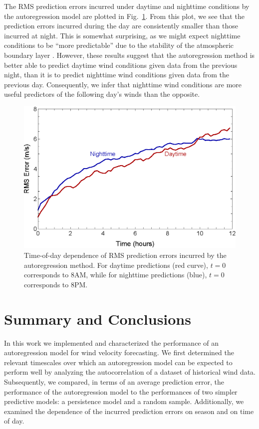 \documentclass[11pt, oneside]{article}
\newcommand{\figref}[1]{Fig.~\ref{#1}}
\begin{document}
The RMS prediction errors incurred under daytime and nighttime conditions by the autoregression model are plotted in \figref{fig:DiurnalRMS}.
From this plot, we see that the prediction errors incurred during the day are consistently smaller than those incurred at night.
This is somewhat surprising, as we might expect nighttime conditions to be ``more predictable'' due to the stability of the atmospheric boundary layer \citep[Fig.~1.7]{Stull1988}.
However, these results suggest that the autoregression method is better able to predict daytime wind conditions given data from the previous night, than it is to predict nighttime wind conditions given data from the previous day.
Consequently, we infer that nighttime wind conditions are more useful predictors of the following day's winds than the opposite. %

\begin{figure}[htb]
\centering
\includegraphics[width=0.7\columnwidth]{figures/DiurnalRMSPredictionError}
\caption{Time-of-day dependence of RMS prediction errors incurred by the autoregression method.
For daytime predictions (red curve), $t = 0$ corresponds to 8AM, while for nighttime predictions (blue), $t = 0$ corresponds to 8PM.}
\label{fig:DiurnalRMS}
\end{figure}

\section{Summary and Conclusions}\label{sec:Conclusions}
In this work we implemented and characterized the performance of an autoregression model for wind velocity forecasting.
We first determined the relevant timescales over which an autoregression model can be expected to perform well by analyzing the autocorrelation of a dataset of historical wind data.
Subsequently, we compared, in terms of an average prediction error, the performance of the autoregression model to the performances of two simpler predictive models: a persistence model and a random sample.
Additionally, we examined the dependence of the incurred prediction errors on season and on time of day.
\end{document}

